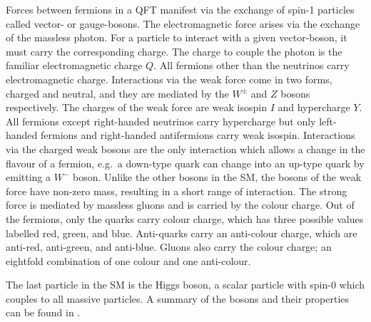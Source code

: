 Forces between fermions in a \Gls{QFT} manifest via the exchange of spin-1 particles called vector- or gauge-bosons.
The electromagnetic force arises via the exchange of the massless photon.
For a particle to interact with a given vector-boson, it must carry the corresponding charge.
The charge to couple the photon is the familiar electromagnetic charge $Q$.
All fermions other than the neutrinos carry electromagnetic charge.
Interactions via the weak force come in two forms, charged and neutral, and they are mediated by the $W^\pm$ and $Z$ bosons respectively.
The charges of the weak force are weak isospin $I$ and hypercharge $Y$.
All fermions except right-handed neutrinos carry hypercharge but only left-handed fermions and right-handed antifermions carry weak isospin.
Interactions via the charged weak bosons are the only interaction which allows a change in the flavour of a fermion, e.g.\ a down-type quark can change into an up-type quark by emitting a $W^-$ boson.
Unlike the other bosons in the \Gls{SM}, the bosons of the weak force have non-zero mass, resulting in a short range of interaction.
The strong force is mediated by massless gluons and is carried by the colour charge.
Out of the fermions, only the quarks carry colour charge, which has three possible values labelled red, green, and blue.
Anti-quarks carry an anti-colour charge, which are anti-red, anti-green, and anti-blue.
Gluons also carry the colour charge; an eightfold combination of one colour and one anti-colour.

The last particle in the \Gls{SM} is the Higgs boson, a scalar particle with spin-0 which couples to all massive particles.
A summary of the bosons and their properties can be found in .


